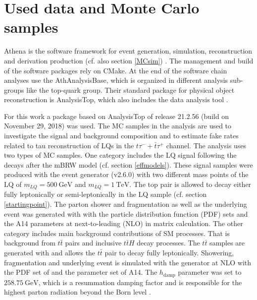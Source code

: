 \section{Used data and Monte Carlo samples}\label{MCsamples}
Athena is the {\ATLAS} software framework for event generation, simulation, reconstruction and derivation production (cf. also section \ref{MCsim}) \cite{Athena}. The management and build of the software packages rely on CMake. At the end of the software chain analyses use the AthAnalysisBase, which is organized in different analysis sub-groups like the top-quark group. Their standard package for physical object reconstruction is AnalysisTop, which also includes the data analysis tool {\ROOT}.\par
For this work a package based on AnalysisTop of release 21.2.56 (build on November 29, 2018) was used.\newline
The MC samples in the analysis are used to investigate the signal and background composition and to estimate fake rates related to tau reconstruction of LQs in the $t\tau^{-}+\bar{t}\tau^{+}$ channel. The analysis uses two types of MC samples. One category includes the LQ signal following the decays after the mBRW model (cf. section \ref{effmodels}). These signal samples were produced with the event generator {\aMCNLO} (v2.6.0) \cite{aMCNlo} with two different mass points of the LQ of $m_{LQ}=\SI{500}{\giga\electronvolt}$ and $m_{LQ}=\SI{1}{\tera\electronvolt}$. The top pair is allowed to decay either fully leptonically or semi-leptonically in the LQ sample (cf. section \ref{startingpoint}). The parton shower and fragmentation as well as the underlying event was generated with {\Pythia} \cite{Pythia8} with the particle distribution function (PDF) sets {\NNPDFd} \cite{NNPDF} and the A14 \cite{A14} parameters at next-to-leading (NLO) in matrix calculation. \newline         
The other category includes main background contributions of SM processes. That is background from $t\bar{t}$ pairs and inclusive $t\bar{t}H$ decay processes. The $t\bar{t}$ samples are generated with {\POWHEG} \cite{Powheg} and allows the $t\bar{t}$ pair to decay fully leptonically. Showering, fragmentation and underlying event is simulated with the generator {\Pythia} at NLO with the PDF set of {\NNPDFz} and the parameter set of A14. The $h_\text{damp}$ parameter was set to $\SI{258.75}{\giga\electronvolt}$, which is a resummation damping factor and is responsible for the highest parton radiation beyond the Born level \cite{hdamp}.\newline
